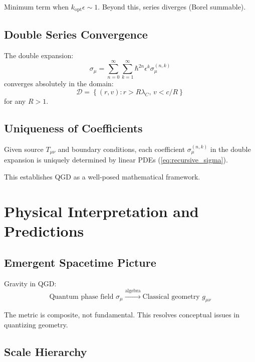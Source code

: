 \documentclass[11pt,a4paper]{article}
\theoremstyle{definition}
\theoremstyle{remark}
\begin{document}
		Minimum term when $k_{\text{opt}}\epsilon \sim 1$. Beyond this, series diverges (Borel summable).
	
	\subsection{Double Series Convergence}
	
		The double expansion:
		\begin{equation}
			\sigma_\mu = \sum_{n=0}^\infty\sum_{k=1}^\infty \hbar^{2n}\epsilon^k\sigma_\mu^{(n,k)}
		\end{equation}
		converges absolutely in the domain:
		\begin{equation}
			\mathcal{D} = \left\{(r,v): r > R\lambda_C, \, v < c/R\right\}
		\end{equation}
		for any $R > 1$.
	
	\subsection{Uniqueness of Coefficients}
	
		Given source $T_{\mu\nu}$ and boundary conditions, each coefficient $\sigma_\mu^{(n,k)}$ in the double expansion is uniquely determined by linear PDEs (\ref{eq:recursive_sigma}).
	
	This establishes QGD as a well-posed mathematical framework.
	
	\section{Physical Interpretation and Predictions}
	
	\subsection{Emergent Spacetime Picture}
	
	Gravity in QGD:
	\begin{equation}
		\text{Quantum phase field } \sigma_\mu \xrightarrow{\text{algebra}} \text{Classical geometry } g_{\mu\nu}
	\end{equation}
	
	The metric is composite, not fundamental. This resolves conceptual issues in quantizing geometry.
	
	\subsection{Scale Hierarchy}
	
\end{document}
